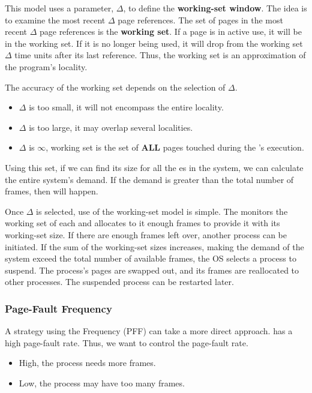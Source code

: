 This model uses a parameter, $\Delta$, to define the \textbf{working-set window}.
The idea is to examine the most recent $\Delta$ page references.
The set of pages in the most recent $\Delta$ page references is the \textbf{working set}.
If a page is in active use, it will be in the working set.
If it is no longer being used, it will drop from the working set $\Delta$ time units after its last reference.
Thus, the working set is an approximation of the program’s locality.

The accuracy of the working set depends on the selection of $\Delta$.
\begin{itemize}[noitemsep]
\item $\Delta$ is too small, it will not encompass the entire locality.
\item $\Delta$ is too large, it may overlap several localities.
\item $\Delta$ is $\infty$, working set is the set of \textbf{ALL} pages touched during the 's execution.
\end{itemize}

Using this set, if we can find its size for all the es in the system, we can calculate the entire system's demand.
If the demand is greater than the total number of frames, then  will happen.

Once $\Delta$ is selected, use of the working-set model is simple.
The  monitors the working set of each  and allocates to it enough frames to provide it with its working-set size.
If there are enough frames left over, another process can be initiated.
If the sum of the working-set sizes increases, making the demand of the system exceed the total number of available frames, the OS selects a process to suspend.
The process’s pages are swapped out, and its frames are reallocated to other processes.
The suspended process can be restarted later.

\subsubsection{Page-Fault Frequency}\label{subsubsec:Page_Fault_Frequency}
A strategy using the  Frequency (PFF) can take a more direct approach.
 has a high page-fault rate.
Thus, we want to control the page-fault rate.
\begin{itemize}[noitemsep]
\item High, the process needs more frames.
\item Low, the process may have too many frames.
\end{itemize}

